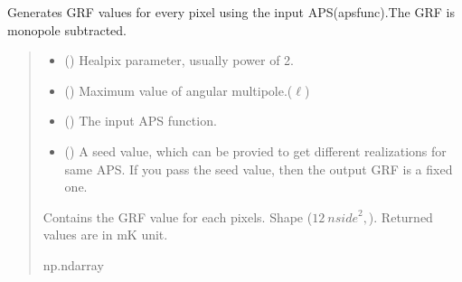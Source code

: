 \documentclass[a4paper,11pt,oneside,english,openany]{sphinxmanual}
\begin{document}

\begin{fulllineitems}
\label{\detokenize{simvis:simvis.grf}}
\pysigstartsignatures
{}
\pysigstopsignatures
\sphinxAtStartPar
Generates  GRF values  for every pixel using the input APS(apsfunc).The GRF is monopole subtracted.
\begin{quote}\begin{description}
\begin{itemize}
\item {} 
\sphinxAtStartPar
{} () \textendash{} Healpix parameter, usually power of 2.

\item {} 
\sphinxAtStartPar
{} () \textendash{} Maximum value of angular multipole.(\(\ell\))

\item {} 
\sphinxAtStartPar
{} () \textendash{} The input APS function.

\item {} 
\sphinxAtStartPar
{} () \textendash{} A seed value, which can be provied to get different realizations for same APS.
If you pass the seed value, then the output GRF is a fixed one.

\end{itemize}

\sphinxAtStartPar
Contains the GRF value for each pixels. Shape (\(12\ {nside}^2,\)). Returned values are in  \(\text{mK}\) unit.

\sphinxAtStartPar
np.ndarray

\end{description}\end{quote}

\clearpage

\end{fulllineitems}
\end{document}
